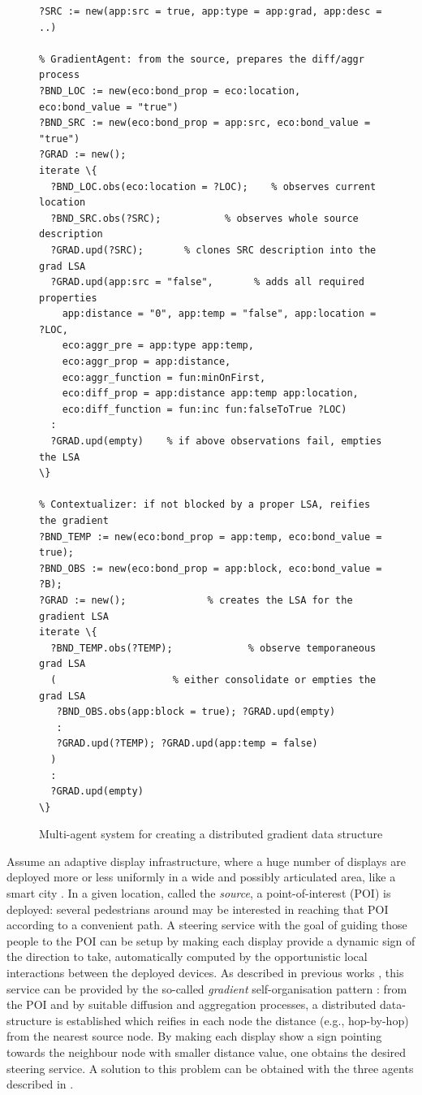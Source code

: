 \documentclass[12pt,a4paper,twoside,openright]{book}
\begin{document}
\begin{figure}
{\footnotesize \begin{Verbatim}[samepage=true, frame=single, commandchars=\\\{\}]
% Source: injecting the source LSA at a POI
?SRC := new(app:src = true, app:type = app:grad, app:desc = ..)

% GradientAgent: from the source, prepares the diff/aggr process
?BND_LOC := new(eco:bond_prop = eco:location, eco:bond_value = "true")
?BND_SRC := new(eco:bond_prop = app:src, eco:bond_value = "true")
?GRAD := new();
iterate \{
  ?BND_LOC.obs(eco:location = ?LOC);    % observes current location
  ?BND_SRC.obs(?SRC);           % observes whole source description
  ?GRAD.upd(?SRC);       % clones SRC description into the grad LSA
  ?GRAD.upd(app:src = "false",       % adds all required properties
    app:distance = "0", app:temp = "false", app:location = ?LOC,
    eco:aggr_pre = app:type app:temp,
    eco:aggr_prop = app:distance,
    eco:aggr_function = fun:minOnFirst,
    eco:diff_prop = app:distance app:temp app:location,
    eco:diff_function = fun:inc fun:falseToTrue ?LOC)
  :
  ?GRAD.upd(empty)    % if above observations fail, empties the LSA
\}
    
% Contextualizer: if not blocked by a proper LSA, reifies the gradient
?BND_TEMP := new(eco:bond_prop = app:temp, eco:bond_value = true);
?BND_OBS := new(eco:bond_prop = app:block, eco:bond_value = ?B);
?GRAD := new();              % creates the LSA for the gradient LSA
iterate \{
  ?BND_TEMP.obs(?TEMP);             % observe temporaneous grad LSA
  (                    % either consolidate or empties the grad LSA    
   ?BND_OBS.obs(app:block = true); ?GRAD.upd(empty)
   :
   ?GRAD.upd(?TEMP); ?GRAD.upd(app:temp = false)
  )
  :
  ?GRAD.upd(empty) 
\}
\end{Verbatim}
}
\caption{Multi-agent system for creating a distributed gradient data structure}\label{f:grad}
\end{figure}

Assume an adaptive display infrastructure, where a huge number of displays are deployed more or less uniformly in a wide and possibly articulated area, like a smart city \cite{Montagna-MONET2012}.
%
In a given location, called the \emph{source}, a point-of-interest (POI) is deployed: several pedestrians around may be interested in reaching that POI according to a convenient path.
%
A steering service with the goal of guiding those people to the POI can be setup by making each display provide a dynamic sign of the direction to take, automatically computed by the opportunistic local interactions between the deployed devices.
%
As described in previous works \cite{Montagna-MONET2012,crf,VCMZ-TAAS2011}, this service can be provided by the so-called \emph{gradient} self-organisation pattern \cite{FDMVA-NACO2012}: from the POI and by suitable diffusion and aggregation processes, a distributed data-structure is established which reifies in each node the distance (e.g., hop-by-hop) from the nearest source node. 
%
By making each display show a sign pointing towards the neighbour node with smaller distance value, one obtains the desired steering service.
%
A solution to this problem can be obtained with the three agents described in .
\end{document}
